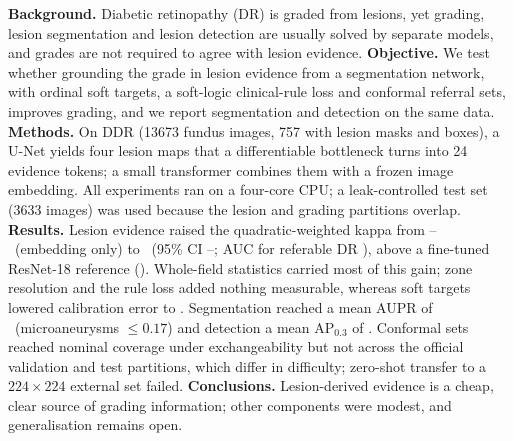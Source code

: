 \textbf{Background.} Diabetic retinopathy (DR) is graded from lesions, yet grading, lesion segmentation and lesion detection are usually solved by separate models, and grades are not required to agree with lesion evidence.
\textbf{Objective.} We test whether grounding the grade in lesion evidence from a segmentation network, with ordinal soft targets, a soft-logic clinical-rule loss and conformal referral sets, improves grading, and we report segmentation and detection on the same data.
\textbf{Methods.} On DDR (\num{13673} fundus images, 757 with lesion masks and boxes), a U-Net yields four lesion maps that a differentiable bottleneck turns into 24 evidence tokens; a small transformer combines them with a frozen image embedding. All experiments ran on a four-core CPU; a leak-controlled test set (3633 images) was used because the lesion and grading partitions overlap.
\textbf{Results.} Lesion evidence raised the quadratic-weighted kappa from \nBoneQWK--\nBtwoQWK\ (embedding only) to \nMainQWK\ (95\% CI \nMainCIlo--\nMainCIhi; AUC for referable DR \nMainAUC), above a fine-tuned ResNet-18 reference (\nFTQWK). Whole-field statistics carried most of this gain; zone resolution and the rule loss added nothing measurable, whereas soft targets lowered calibration error to \nMainECE. Segmentation reached a mean AUPR of \nSegAUPRFtlbg\ (microaneurysms $\le0.17$) and detection a mean AP$_{0.3}$ of \nDetMapFtlbg. Conformal sets reached nominal coverage under exchangeability but not across the official validation and test partitions, which differ in difficulty; zero-shot transfer to a $224\times224$ external set failed.
\textbf{Conclusions.} Lesion-derived evidence is a cheap, clear source of grading information; other components were modest, and generalisation remains open.
